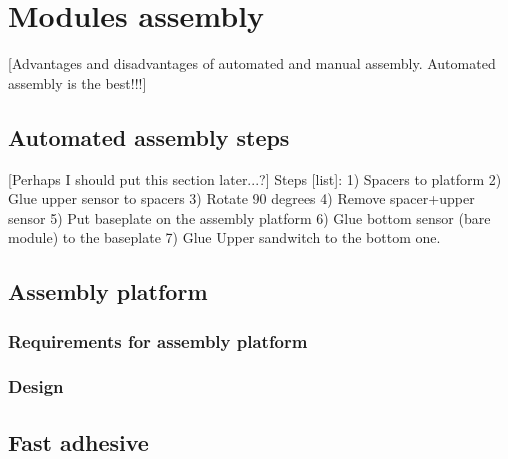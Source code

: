 \chapter{Modules assembly}

[Advantages and disadvantages of automated and manual assembly. Automated assembly is the best!!!]

\section{Automated assembly steps}

[Perhaps I should put this section later...?]
Steps [list]:
1) Spacers to platform
2) Glue upper sensor to spacers
3) Rotate 90 degrees
4) Remove spacer+upper sensor
5) Put baseplate on the assembly platform
6) Glue bottom sensor (bare module) to the baseplate
7) Glue Upper sandwitch to the bottom one.


\section{Assembly platform}




\subsection{Requirements for assembly platform}



\subsection{Design}



\section{Fast adhesive}

